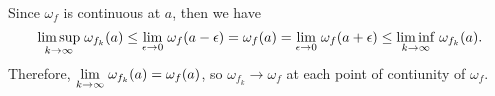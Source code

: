 \documentclass[a4paper,11pt]{article}
\begin{document}
\begin{enumerate}
Since $\omega_f$ is continuous at $a$, then we have
$$\underset{k \to \infty}{\lim \sup} \hspace{0.1cm} \omega_{f_k}(a)
\leq \underset{\epsilon \to 0}{\lim} \hspace{0.1cm} \omega_f (a - \epsilon)
= \omega_f (a)
= \underset{\epsilon \to 0}{\lim} \hspace{0.1cm} \omega_f (a + \epsilon)
\leq \underset{k \to \infty}{\lim \inf} \hspace{0.1cm} \omega_{f_k}(a).$$
Therefore, $\underset{k \to \infty}{\lim} \hspace{0.1cm} \omega_{f_k} (a) = \omega_f(a)$, so $\omega_{f_k} \to \omega_f$ at each point of contiunity of $\omega_f$.





\end{enumerate}
\end{document}
